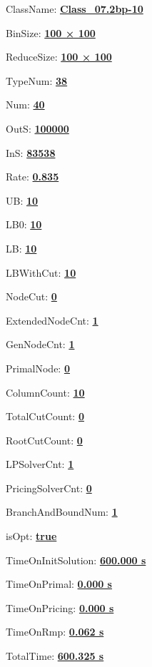 \documentclass[11pt]{article}
\begin{document}
\pagestyle{empty}


ClassName: \underline{\textbf{Class_07.2bp-10}}
\par
BinSize: \underline{\textbf{100 × 100}}
\par
ReduceSize: \underline{\textbf{100 × 100}}
\par
TypeNum: \underline{\textbf{38}}
\par
Num: \underline{\textbf{40}}
\par
OutS: \underline{\textbf{100000}}
\par
InS: \underline{\textbf{83538}}
\par
Rate: \underline{\textbf{0.835}}
\par
UB: \underline{\textbf{10}}
\par
LB0: \underline{\textbf{10}}
\par
LB: \underline{\textbf{10}}
\par
LBWithCut: \underline{\textbf{10}}
\par
NodeCut: \underline{\textbf{0}}
\par
ExtendedNodeCnt: \underline{\textbf{1}}
\par
GenNodeCnt: \underline{\textbf{1}}
\par
PrimalNode: \underline{\textbf{0}}
\par
ColumnCount: \underline{\textbf{10}}
\par
TotalCutCount: \underline{\textbf{0}}
\par
RootCutCount: \underline{\textbf{0}}
\par
LPSolverCnt: \underline{\textbf{1}}
\par
PricingSolverCnt: \underline{\textbf{0}}
\par
BranchAndBoundNum: \underline{\textbf{1}}
\par
isOpt: \underline{\textbf{true}}
\par
TimeOnInitSolution: \underline{\textbf{600.000 s}}
\par
TimeOnPrimal: \underline{\textbf{0.000 s}}
\par
TimeOnPricing: \underline{\textbf{0.000 s}}
\par
TimeOnRmp: \underline{\textbf{0.062 s}}
\par
TotalTime: \underline{\textbf{600.325 s}}
\par
\newpage


\end{document}
